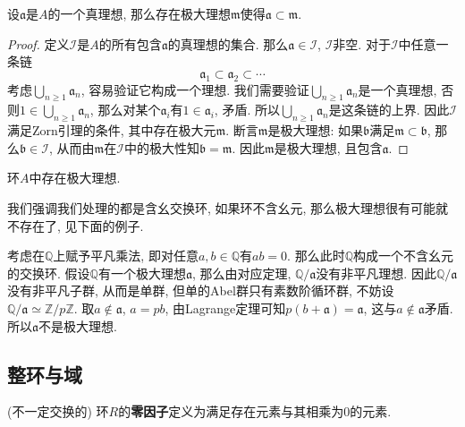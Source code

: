 \begin{prop}
    设$\mathfrak{a}$是$A$的一个真理想, 那么存在极大理想$\mathfrak{m}$使得$\mathfrak{a}\subset\mathfrak{m}$.
\end{prop}
\begin{proof}
    定义$\mathscr{I}$是$A$的所有包含$\mathfrak{a}$的真理想的集合.
    那么$\mathfrak{a}\in\mathscr{I}$, $\mathscr{I}$非空.
    对于$\mathscr{I}$中任意一条链
    \[\mathfrak{a}_1\subset\mathfrak{a}_2\subset\cdots\]
    考虑$\bigcup_{n\geq 1}\mathfrak{a}_n$, 容易验证它构成一个理想.
    我们需要验证$\bigcup_{n\geq 1}\mathfrak{a}_n$是一个真理想, 否则$1\in\bigcup_{n\geq 1}\mathfrak{a}_n$, 那么对某个$\mathfrak{a}_i$有$1\in\mathfrak{a}_i$, 矛盾.
    所以$\bigcup_{n\geq 1}\mathfrak{a}_n$是这条链的上界.
    因此$\mathscr{I}$满足Zorn引理的条件, 其中存在极大元$\mathfrak{m}$.
    断言$\mathfrak{m}$是极大理想:
    如果$\mathfrak{b}$满足$\mathfrak{m}\subset\mathfrak{b}$, 那么$\mathfrak{b}\in\mathscr{I}$, 从而由$\mathfrak{m}$在$\mathscr{I}$中的极大性知$\mathfrak{b}=\mathfrak{m}$.
    因此$\mathfrak{m}$是极大理想, 且包含$\mathfrak{a}$.
\end{proof}

\begin{col}
    环$A$中存在极大理想.
\end{col}

\begin{rem}
    我们强调我们处理的都是含幺交换环, 如果环不含幺元, 那么极大理想很有可能就不存在了, 见下面的例子.
\end{rem}

\begin{eg}
    考虑在$\mathbb{Q}$上赋予平凡乘法, 即对任意$a,b\in\mathbb{Q}$有$ab=0$.
    那么此时$\mathbb{Q}$构成一个不含幺元的交换环.
    假设$\mathbb{Q}$有一个极大理想$\mathfrak{a}$, 那么由对应定理, $\mathbb{Q}/\mathfrak{a}$没有非平凡理想.
    因此$\mathbb{Q}/\mathfrak{a}$没有非平凡子群, 从而是单群, 但单的Abel群只有素数阶循环群, 不妨设$\mathbb{Q}/\mathfrak{a}\simeq\mathbb{Z}/p\mathbb{Z}$.
    取$a\notin\mathfrak{a}$, $a=pb$, 由Lagrange定理可知$p(b+\mathfrak{a})=\mathfrak{a}$, 这与$a\notin\mathfrak{a}$矛盾.
    所以$\mathfrak{a}$不是极大理想.
\end{eg}

\subsection{整环与域}

\begin{defn}
    (不一定交换的) 环$R$的\textbf{零因子}定义为满足存在元素与其相乘为$0$的元素.
\end{defn}


